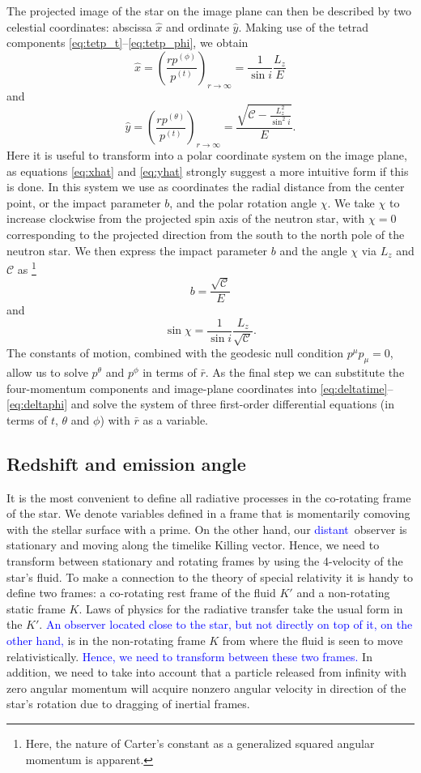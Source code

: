 \documentclass{aa}
\newcommand{\be}{\begin{equation}}
\newcommand{\ee}{\end{equation}}
\newcommand{\refe}[1]{\textcolor{blue}{{#1}}}
\newcommand{\Ca}{\ensuremath{\mathcal{C}}}
\newcommand{\rb}{\ensuremath{\bar{r}}}
\begin{document}
The projected image of the star on the image plane can then be described by two celestial coordinates:
abscissa $\hat{x}$ and ordinate $\hat{y}$.
Making use of the tetrad components \eqref{eq:tetp_t}--\eqref{eq:tetp_phi}, we obtain \citep[][p.347]{cha}
\be\label{eq:xhat}
\hat{x} = \left( \frac{rp^{(\phi)}}{p^{(t)}} \right)_{r \rightarrow \infty} = \frac{1}{\sin i} \frac{L_z}{E}
\ee
and
\be\label{eq:yhat}
\hat{y} = \left( \frac{rp^{(\theta)}}{p^{(t)}} \right)_{r \rightarrow \infty} = \frac{\sqrt{\Ca - \frac{L_z^2}{\sin^2 i}}}{E}.
\ee
Here it is useful to transform into a polar coordinate system on the image plane, as equations \eqref{eq:xhat} and \eqref{eq:yhat} strongly suggest a more intuitive form if this is done. 
In this system we use as coordinates the radial distance from the center point, or the impact parameter $b$, and the polar rotation angle $\chi$.  
We take $\chi$ to increase clockwise from the projected spin axis of the neutron star, with $\chi=0$ corresponding to the projected direction from the south to the north pole of the neutron star.  
We then express the impact parameter $b$ and the angle $\chi$ via $L_z$ and $\Ca$ as%
\footnote{
    Here, the nature of Carter's constant as a generalized squared
    angular momentum is apparent.
}
\be
b = \frac{\sqrt{\Ca}}{E}
\ee
and
\be
\sin \chi = \frac{1}{\sin i} \frac{L_z}{\sqrt{\Ca}}.
\ee
The constants of motion, combined with the geodesic null condition $p^\mu p_\mu = 0$, allow us to solve $p^\theta$ and $p^\phi$ in terms of $\rb$.
As the final step we can substitute the four-momentum components and image-plane coordinates into \eqref{eq:deltatime}--\eqref{eq:deltaphi} and solve the system of three first-order differential equations (in terms of $t$, $\theta$ and $\phi$) with $\rb$ as a variable.


\subsection{Redshift and emission angle}\label{sect:redshift_angle}
It is the most convenient to define all radiative processes in the co-rotating frame of the star.
We denote variables defined in a frame that is momentarily comoving with the stellar surface with a prime.  
On the other hand, our \refe{distant} observer is stationary and moving along the timelike Killing vector.  
Hence, we need to transform between stationary and rotating frames by using the 4-velocity of the star's fluid.  
To make a connection to the theory of special relativity it is handy to define two frames: 
a co-rotating rest frame of the fluid $K'$ and a non-rotating static frame $K$.
Laws of physics for the radiative transfer take the usual form in the $K'$.
\refe{An observer located close to the star, but not directly on top of it, on the other hand,} is in the non-rotating frame $K$ from where the fluid is seen to move relativistically.
\refe{Hence, we need to transform between these two frames.}
In addition, we need to take into account that a particle released from infinity with zero angular momentum will acquire nonzero angular velocity in direction of the star's rotation due to dragging of inertial frames.
\end{document}
